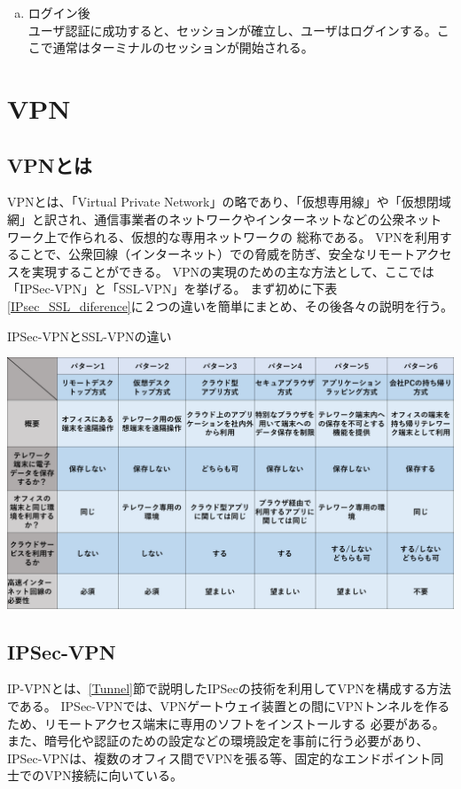 \documentclass[11pt,a4j,titlepage]{jreport}
\begin{document}
\begin{enumerate}[(a)]
\begin{enumerate}[(1)]
    \end{enumerate}
    \item ログイン後\mbox{}\\
    ユーザ認証に成功すると、セッションが確立し、ユーザはログインする。ここで通常はターミナルのセッションが開始される。
    
\end{enumerate}


\section{VPN}\label{aboutVPN}

\subsection*{VPNとは}
VPNとは、「Virtual Private Network」の略であり、「仮想専用線」や「仮想閉域網」と訳され、通信事業者のネットワークやインターネットなどの公衆ネットワーク上で作られる、仮想的な専用ネットワークの
総称である。
VPNを利用することで、公衆回線（インターネット）での脅威を防ぎ、安全なリモートアクセスを実現することができる。
VPNの実現のための主な方法として、ここでは「IPSec-VPN」と「SSL-VPN」を挙げる。
まず初めに下表\ref{IPsec_SSL_diference}に２つの違いを簡単にまとめ、その後各々の説明を行う。
\begin{table}[tbp]
    \centering
    \caption{IPSec-VPNとSSL-VPNの違い}
    \includegraphics[width=1.0\textwidth, page=2]{graphs/telework_list.pdf}
    \label{IPsec_SSL_diference}
\end{table}

\subsection{IPSec-VPN}
IP-VPNとは、\ref{Tunnel}節で説明したIPSecの技術を利用してVPNを構成する方法である。
IPSec-VPNでは、VPNゲートウェイ装置との間にVPNトンネルを作るため、リモートアクセス端末に専用のソフトをインストールする
必要がある。また、暗号化や認証のための設定などの環境設定を事前に行う必要があり、
IPSec-VPNは、複数のオフィス間でVPNを張る等、固定的なエンドポイント同士でのVPN接続に向いている。
\end{document}
